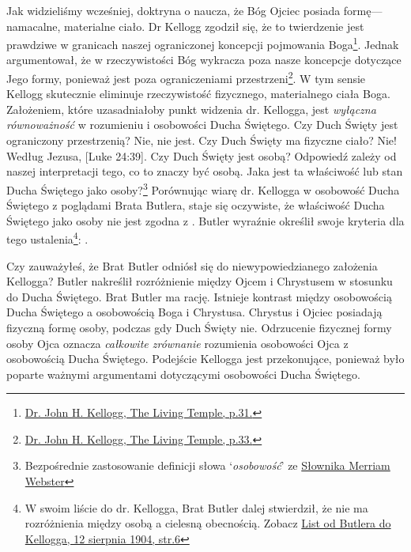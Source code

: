 Jak widzieliśmy wcześniej, doktryna o  naucza, że Bóg Ojciec posiada formę—namacalne, materialne ciało. Dr Kellogg zgodził się, że to twierdzenie jest prawdziwe w granicach naszej ograniczonej koncepcji pojmowania Boga\footnote{\href{https://archive.org/details/J.H.Kellogg.TheLivingTemple1903/page/n33/}{Dr. John H. Kellogg, The Living Temple, p.31.}}. Jednak argumentował, że w rzeczywistości Bóg wykracza poza nasze koncepcje dotyczące Jego formy, ponieważ jest poza ograniczeniami przestrzeni\footnote{\href{https://archive.org/details/J.H.Kellogg.TheLivingTemple1903/page/n33/}{Dr. John H. Kellogg, The Living Temple, p.33.}}. W tym sensie Kellogg skutecznie eliminuje rzeczywistość fizycznego, materialnego ciała Boga. Założeniem, które uzasadniałoby punkt widzenia dr. Kellogga, jest \textit{wyłączna równoważność} w rozumieniu  i osobowości Ducha Świętego. Czy Duch Święty jest ograniczony przestrzenią? Nie, nie jest. Czy Duch Święty ma fizyczne ciało? Nie! Według Jezusa, [Luke 24:39]. Czy Duch Święty jest osobą? Odpowiedź zależy od naszej interpretacji tego, co to znaczy być osobą. Jaka jest ta właściwość lub stan Ducha Świętego jako osoby?\footnote{Bezpośrednie zastosowanie definicji słowa ‘\textit{osobowość}’ ze \href{https://www.merriam-webster.com/dictionary/personality}{Słownika Merriam Webster}} Porównując wiarę dr. Kellogga w osobowość Ducha Świętego z poglądami Brata Butlera, staje się oczywiste, że właściwość Ducha Świętego jako osoby nie jest zgodna z . Butler wyraźnie określił swoje kryteria dla tego ustalenia\footnote{W swoim liście do dr. Kellogga, Brat Butler dalej stwierdził, że nie ma rozróżnienia między osobą a cielesną obecnością. Zobacz \href{https://c7da.us/egwdl/Butler\%20to\%20Kellogg\%20Aug121904.pdf}{List od Butlera do Kellogga, 12 sierpnia 1904, str.6}}: .

Czy zauważyłeś, że Brat Butler odniósł się do niewypowiedzianego założenia Kellogga? Butler nakreślił rozróżnienie między Ojcem i Chrystusem w stosunku do Ducha Świętego. Brat Butler ma rację. Istnieje kontrast między osobowością Ducha Świętego a osobowością Boga i Chrystusa. Chrystus i Ojciec posiadają fizyczną formę osoby, podczas gdy Duch Święty nie. Odrzucenie fizycznej formy osoby Ojca oznacza \textit{całkowite zrównanie} rozumienia osobowości Ojca z osobowością Ducha Świętego. Podejście Kellogga jest przekonujące, ponieważ było poparte ważnymi argumentami dotyczącymi osobowości Ducha Świętego.

